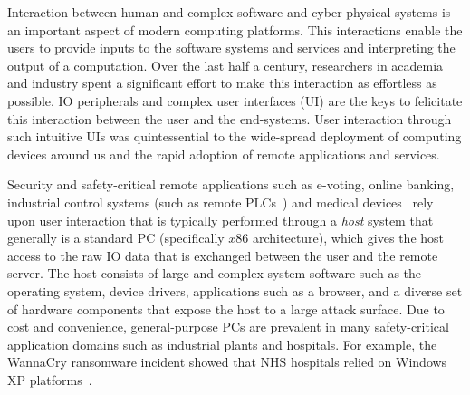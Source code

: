 Interaction between human and complex software and cyber-physical systems is an important aspect of modern computing platforms. This interactions enable the users to provide inputs to the software systems and services and interpreting the output of a computation. Over the last half a century, researchers in academia and industry spent a significant effort to make this interaction as effortless as possible. IO peripherals and complex user interfaces (UI) are the keys to felicitate this interaction between the user and the end-systems. User interaction through such intuitive UIs was quintessential to the wide-spread deployment of computing devices around us and the rapid adoption of remote applications and services. 

Security and safety-critical remote applications such as e-voting, online banking, industrial control systems (such as remote PLCs~\cite{controlbyweb}) and medical devices~\cite{medicalDevice} rely upon user interaction that is typically performed through a \emph{host} system that generally is a standard PC (specifically $x86$ architecture), which gives the host access to the raw IO data that is exchanged between the user and the remote server. The host consists of large and complex system software such as the operating system, device drivers, applications such as a browser, and a diverse set of hardware components that expose the host to a large attack surface. Due to cost and convenience, general-purpose PCs are prevalent in many safety-critical application domains such as industrial plants and hospitals. For example, the WannaCry ransomware incident showed that NHS hospitals relied on Windows XP platforms~\cite{berry_2017,field_wannacry_2018}. 


